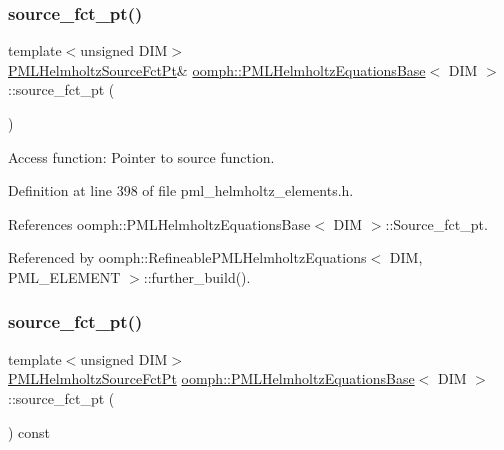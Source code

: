 \subsubsection{\texorpdfstring{source\+\_\+fct\+\_\+pt()}{source\_fct\_pt()}\hspace{0.1cm}{\footnotesize\ttfamily [1/2]}}
{\footnotesize\ttfamily template$<$unsigned D\+IM$>$ \\
\hyperlink{classoomph_1_1PMLHelmholtzEquationsBase_abf57477abc2672cd680742e17721a07f}{P\+M\+L\+Helmholtz\+Source\+Fct\+Pt}\& \hyperlink{classoomph_1_1PMLHelmholtzEquationsBase}{oomph\+::\+P\+M\+L\+Helmholtz\+Equations\+Base}$<$ D\+IM $>$\+::source\+\_\+fct\+\_\+pt (\begin{DoxyParamCaption}{ }\end{DoxyParamCaption})\hspace{0.3cm}{\ttfamily [inline]}}



Access function\+: Pointer to source function. 



Definition at line 398 of file pml\+\_\+helmholtz\+\_\+elements.\+h.



References oomph\+::\+P\+M\+L\+Helmholtz\+Equations\+Base$<$ D\+I\+M $>$\+::\+Source\+\_\+fct\+\_\+pt.



Referenced by oomph\+::\+Refineable\+P\+M\+L\+Helmholtz\+Equations$<$ D\+I\+M, P\+M\+L\+\_\+\+E\+L\+E\+M\+E\+N\+T $>$\+::further\+\_\+build().

\mbox{\label{classoomph_1_1PMLHelmholtzEquationsBase_a185efe8aa7459ee8e6241eb94eb6e6f7}} 
\subsubsection{\texorpdfstring{source\+\_\+fct\+\_\+pt()}{source\_fct\_pt()}\hspace{0.1cm}{\footnotesize\ttfamily [2/2]}}
{\footnotesize\ttfamily template$<$unsigned D\+IM$>$ \\
\hyperlink{classoomph_1_1PMLHelmholtzEquationsBase_abf57477abc2672cd680742e17721a07f}{P\+M\+L\+Helmholtz\+Source\+Fct\+Pt} \hyperlink{classoomph_1_1PMLHelmholtzEquationsBase}{oomph\+::\+P\+M\+L\+Helmholtz\+Equations\+Base}$<$ D\+IM $>$\+::source\+\_\+fct\+\_\+pt (\begin{DoxyParamCaption}{ }\end{DoxyParamCaption}) const\hspace{0.3cm}{\ttfamily [inline]}}



